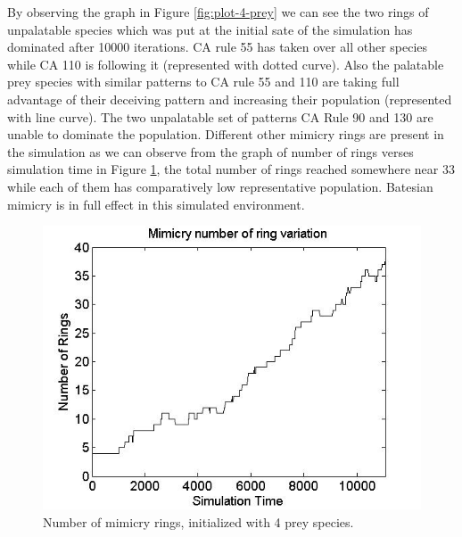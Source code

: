 By observing the graph in Figure \ref{fig:plot-4-prey} we can see the two rings of unpalatable species which was put at the initial sate of the simulation has dominated after 10000 iterations. CA rule 55 has taken over all other species while CA 110 is following it (represented with dotted curve). Also the palatable prey species with similar patterns to CA rule 55 and 110 are taking full advantage of their deceiving pattern and increasing their population (represented with line curve). The two unpalatable set of patterns CA Rule 90 and 130 are unable to dominate the population. Different other mimicry rings are present in the simulation as we can observe from the graph of number of rings verses simulation time in Figure \ref{fig:ringSize10k-4Prey}, the total number of rings reached somewhere near 33 while each of them has comparatively low representative population. Batesian mimicry is in full effect in this simulated environment.

\begin{figure}[H]
	\centering
	\includegraphics[scale=0.50]{images/ringSize10k-4Prey}
	\caption[Number of mimicry rings (4 prey species)]{Number of mimicry rings, initialized with 4 prey species.}
	\label{fig:ringSize10k-4Prey}
\end{figure}

